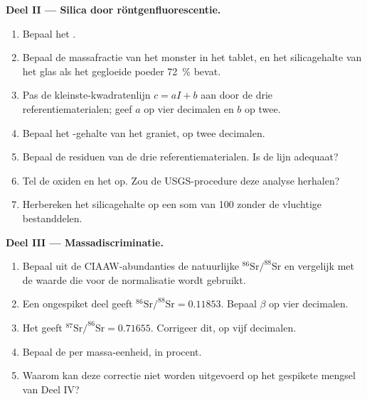 \begin{problem}
\noindent\textbf{Deel II --- Silica door röntgenfluorescentie.}
\begin{enumerate}[resume]
  \item Bepaal het .
  \item Bepaal de massafractie van het monster in het tablet, en het silicagehalte van het glas als het
        gegloeide poeder \qty{72}{\percent} bevat.
  \item Pas de kleinste-kwadratenlijn $c = aI + b$ aan door de drie referentiematerialen; geef $a$ op
        vier decimalen en $b$ op twee.
  \item Bepaal het -gehalte van het graniet, op twee decimalen.
  \item Bepaal de residuen van de drie referentiematerialen. Is de lijn adequaat?
  \item Tel de oxiden en het  op. Zou de USGS-procedure deze analyse herhalen?
  \item Herbereken het silicagehalte op een som van 100 zonder de vluchtige bestanddelen.
\end{enumerate}

\noindent\textbf{Deel III --- Massadiscriminatie.}
\begin{enumerate}[resume]
  \item Bepaal uit de CIAAW-abundanties de natuurlijke $^{86}\mathrm{Sr}/^{88}\mathrm{Sr}$ en vergelijk
        met de waarde die voor de normalisatie wordt gebruikt.
  \item Een ongespiket deel geeft $^{86}\mathrm{Sr}/^{88}\mathrm{Sr} = 0.11853$. Bepaal $\beta$ op
        vier decimalen.
  \item Het geeft $^{87}\mathrm{Sr}/^{86}\mathrm{Sr} = 0.71655$. Corrigeer dit, op vijf decimalen.
  \item Bepaal de  per massa-eenheid, in procent.
  \item Waarom kan deze correctie niet worden uitgevoerd op het gespikete mengsel van Deel IV?
\end{enumerate}


\end{problem}
